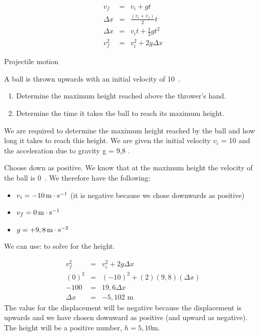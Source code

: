 \begin{eqnarray}
v_f &=& v_i + gt \label{eq:pg:eq1}\\
\Delta x &=& \frac{(v_i + v_f)}{2} t\label{eq:pg:eq2}\\
\Delta x &=& v_it + \frac{1}{2}gt^2 \label{eq:pg:eq3}\\
v_f^2 &=& v_i^2 + 2g\Delta x \label{eq:pg:eq4}
\end{eqnarray}
\begin{wex}{Projectile motion}{A ball is thrown upwards with an initial velocity of 10~\ms. \begin{enumerate}
	\item Determine the maximum height reached above the thrower's hand.
	\item Determine the time it takes the ball to reach its maximum height.
	\end{enumerate}}
{
We are required to determine the maximum height reached by the ball and how long it takes to reach this height. We are given the initial velocity $v_i$ = 10 \ms and the acceleration due to gravity g = 9,8 \mss.

Choose down as positive. We know that at the maximum height the velocity of the ball is 0~\ms. We therefore have the following:
\begin{itemize}
\item{$v_i=-10\,\mathrm{m \cdot s^{-1}}$ (it is negative because we chose downwards as positive)}
\item{$v_f=0\,\mathrm{m \cdot s^{-1}}$}
\item{$g=+9,8\,\mathrm{m \cdot s^{-2}}$}
\end{itemize}

We can use:
to solve for the height.

\begin{eqnarray*}
v_f^2 &=& v_i^2 + 2g\Delta x\\
(0)^{2} &=& (-10)^{2} + (2)(9,8)  (\Delta x)\\
-100 &=& 19,6 \Delta x\\
\Delta x &=& -5,102\text{ m}
\end{eqnarray*}
The value for the displacement will be negative because the displacement is upwards and we have chosen downward as positive (and upward as negative). The height will be a positive number, $h=5,10$m.

}
\end{wex}
